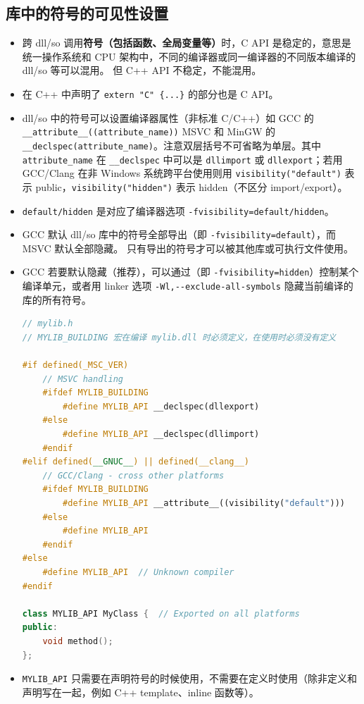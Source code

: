 
\subsection{库中的符号的可见性设置}
\begin{itemize}
\item 跨 dll/so 调用\textbf{符号（包括函数、全局变量等）}时，C API 是稳定的，意思是统一操作系统和 CPU 架构中，不同的编译器或同一编译器的不同版本编译的 dll/so 等可以混用。 但 C++ API 不稳定，不能混用。
\item 在 C++ 中声明了 \verb`extern "C" {...}` 的部分也是 C API。
\item dll/so 中的符号可以设置编译器属性（非标准 C/C++）如 GCC 的 \verb`__attribute__((attribute_name))` MSVC 和 MinGW 的 \verb`__declspec(attribute_name)`。注意双层括号不可省略为单层。其中 \verb`attribute_name` 在 \verb`__declspec` 中可以是 \verb`dllimport` 或 \verb`dllexport`；若用 GCC/Clang 在非 Windows 系统跨平台使用则用 \verb`visibility("default")` 表示 public，\verb`visibility("hidden")` 表示 hidden（不区分 import/export）。
\item \verb`default/hidden` 是对应了编译器选项 \verb`-fvisibility=default/hidden`。
\item GCC 默认 dll/so 库中的符号全部导出（即 \verb`-fvisibility=default`），而 MSVC 默认全部隐藏。 只有导出的符号才可以被其他库或可执行文件使用。
\item GCC 若要默认隐藏（推荐），可以通过（即 \verb`-fvisibility=hidden`）控制某个编译单元，或者用 linker 选项 \verb`-Wl,--exclude-all-symbols` 隐藏当前编译的库的所有符号。
\begin{lstlisting}[language=cpp]
// mylib.h
// MYLIB_BUILDING 宏在编译 mylib.dll 时必须定义，在使用时必须没有定义

#if defined(_MSC_VER)
    // MSVC handling
    #ifdef MYLIB_BUILDING
        #define MYLIB_API __declspec(dllexport)
    #else
        #define MYLIB_API __declspec(dllimport)
    #endif
#elif defined(__GNUC__) || defined(__clang__)
    // GCC/Clang - cross other platforms
    #ifdef MYLIB_BUILDING
        #define MYLIB_API __attribute__((visibility("default")))
    #else
        #define MYLIB_API
    #endif
#else
    #define MYLIB_API  // Unknown compiler
#endif

class MYLIB_API MyClass {  // Exported on all platforms
public:
    void method();
};
\end{lstlisting}
\item \verb`MYLIB_API` 只需要在声明符号的时候使用，不需要在定义时使用（除非定义和声明写在一起，例如 C++ template、inline 函数等）。
\end{itemize}

